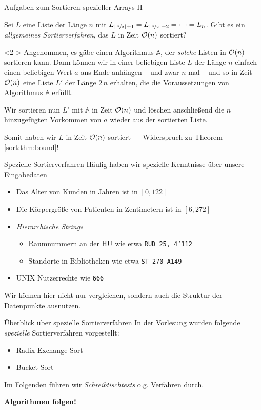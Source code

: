 \begin{frame}{Aufgaben zum Sortieren spezieller Arrays II}
\begin{task}
Sei $L$ eine Liste der L\"ange $n$ mit $L_{\lfloor\nicefrac{n}{2}\rfloor + 1} = L_{\lfloor\nicefrac{n}{2}\rfloor + 2} = \dots = L_n$.
Gibt es ein \emph{allgemeines Sortierverfahren}, das $L$ in Zeit $\mathcal{O}(n)$ sortiert?
\end{task}

\begin{solution}<2->
Angenommen, es g\"abe einen Algorithmus $\mathbb{A}$, der \emph{solche} Listen in $\mathcal{O}(n)$ sortieren kann.
Dann k\"onnen wir in einer \alert{beliebigen} Liste $L$ der L\"ange $n$ einfach einen beliebigen Wert $a$ ans Ende anh\"angen -- und zwar $n$-mal -- und so in Zeit $\mathcal{O}(n)$ eine Liste $L'$ der L\"ange $2 \, n$ erhalten, die die Voraussetzungen von Algorithmus $\mathbb{A}$ erf\"ullt.

Wir sortieren nun $L'$ mit $\mathbb{A}$ in Zeit $\mathcal{O}(n)$ und l\"oschen anschlie{\ss}end die $n$ hinzugef\"ugten Vorkommen von $a$ wieder aus der sortierten Liste.

Somit haben wir $L$ in Zeit $\mathcal{O}(n)$ sortiert --- Widerspruch zu Theorem \ref{sort:thm:bound}!
\end{solution}
\end{frame}


\begin{frame}{Spezielle Sortierverfahren}
H\"aufig haben wir \alert{spezielle Kenntnisse} \"uber unsere Eingabedaten
\begin{itemize}
    \item Das Alter von Kunden in Jahren ist in $[0, 122]$
    \item Die K\"orpergr\"o{\ss}e von Patienten in Zentimetern ist in $[6, 272]$
    \item \emph{Hierarchische Strings}
    \begin{itemize}
        \item Raumnummern an der HU wie etwa \texttt{RUD 25, 4'112}
        \item Standorte in Bibliotheken wie etwa \texttt{ST 270 A149}
    \end{itemize}
    \item UNIX Nutzerrechte wie \texttt{666}
\end{itemize}
Wir k\"onnen hier nicht nur vergleichen, sondern auch die \alert{Struktur} der Datenpunkte ausnutzen.
\end{frame}

\begin{frame}{\"Uberblick \"uber spezielle Sortierverfahren}
In der Vorlesung wurden folgende \emph{spezielle} Sortierverfahren vorgestellt:
\begin{itemize}
    \item Radix Exchange Sort
    \item Bucket Sort
\end{itemize}
Im Folgenden f\"uhren wir \emph{Schreibtischtests} o.g. Verfahren durch.

\medskip

\textbf{Algorithmen folgen!}
\end{frame}
